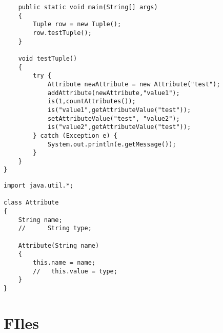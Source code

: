 \documentclass[11pt]{article} %
\begin{document}
\begin{lstlisting}
    public static void main(String[] args)
    {
        Tuple row = new Tuple();
        row.testTuple();
    }

    void testTuple()
    {
        try {
            Attribute newAttribute = new Attribute("test");
            addAttribute(newAttribute,"value1");
            is(1,countAttributes());
            is("value1",getAttributeValue("test"));
            setAttributeValue("test", "value2");
            is("value2",getAttributeValue("test"));
        } catch (Exception e) {
            System.out.println(e.getMessage());
        }
    }
}

\end{lstlisting}

\begin{lstlisting}
import java.util.*;

class Attribute
{
    String name;
    //      String type;
    
    Attribute(String name)
    {
        this.name = name;
        //   this.value = type;
    }
}
\end{lstlisting}


\section{FIles} 

\begin{lstlisting}
\end{lstlisting}

\begin{lstlisting}
\end{lstlisting}

\begin{lstlisting}
\end{lstlisting}

\begin{lstlisting}
\end{lstlisting}

\begin{lstlisting}
\end{lstlisting}
\end{document}
